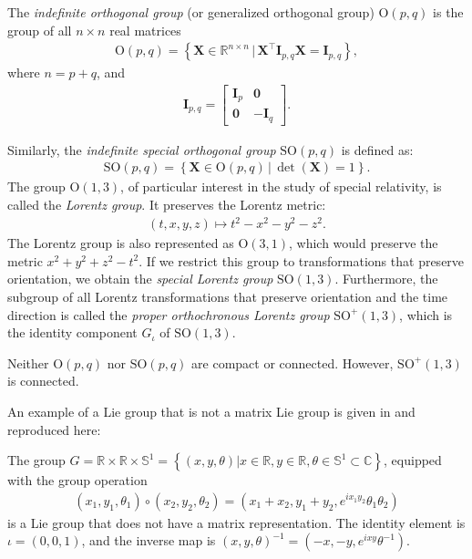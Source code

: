 \begin{example}\label{ex:indefinite-orthogonal-group-lorentz-group}
    The \emph{indefinite orthogonal group} (or generalized orthogonal group) $\text{O}(p,q)$ is the group of all $n\times n$ real matrices
    \begin{align}
        \text{O}(p,q) = \left\{\mathbf{X}\in\mathbb{R}^{n\times n} \,|\, \mathbf{X}^\top\mathbf{I}_{p,q}\mathbf{X} = \mathbf{I}_{p,q}\right\},
    \end{align}
    where $n=p+q$, and
    \begin{align}
        \mathbf{I}_{p,q} = \begin{bmatrix}
            \mathbf{I}_p & \mathbf{0}\\
            \mathbf{0} & -\mathbf{I}_q
        \end{bmatrix}.
    \end{align}

    Similarly, the \emph{indefinite special orthogonal group} $\text{SO}(p,q)$ is defined as:
    \begin{align}
        \text{SO}(p, q) = \left\{\mathbf{X}\in\text{O}(p, q) \,|\, \det(\mathbf{X})=1\right\}.
    \end{align}
    The group $\text{O}(1,3)$, of particular interest in the study of special relativity, is called the \emph{Lorentz group}. It preserves the Lorentz metric:
    \begin{align}
        (t,x,y,z) \mapsto t^2 - x^2 - y^2 - z^2.
    \end{align}
    The Lorentz group is also represented as $\text{O}(3,1)$, which would preserve the metric $x^2 + y^2 + z^2 - t^2$. If we restrict this group to transformations that preserve orientation, we obtain the \emph{special Lorentz group} $\text{SO}(1,3)$. Furthermore, the subgroup of all Lorentz transformations that preserve orientation and the time direction is called the  \emph{proper orthochronous Lorentz group} $\text{SO}^+(1,3)$, which is the identity component $G_\iota$ of $\text{SO}(1,3)$.
    
    Neither $\text{O}(p,q)$ nor $\text{SO}(p,q)$ are compact or connected. However, $\text{SO}^+(1,3)$ is connected.
\end{example}
\begin{example}\label{ex:non-matrix-lie-group}
    An example of a Lie group that is not a matrix Lie group is given in \citet[p. 25]{Hall2015} and reproduced here:

    The group $G = \mathbb{R} \times \mathbb{R} \times \mathbb{S}^1 = \left\{(x, y, \theta) | x \in \mathbb{R}, y \in \mathbb{R}, \theta \in \mathbb{S}^1\subset\mathbb{C}\right\}$, equipped with the group operation
    \begin{align}
        (x_1, y_1, \theta_1)\circ (x_2, y_2, \theta_2) = (x_1 + x_2, y_1 + y_2, e^{ix_1y_2}\theta_1\theta_2)
    \end{align}
    is a Lie group that does not have a matrix representation. The identity element is $\iota=(0, 0, 1)$, and the inverse map is $(x, y, \theta)^{-1} = (-x, -y, e^{ixy}\theta^{-1})$.
\end{example} 

